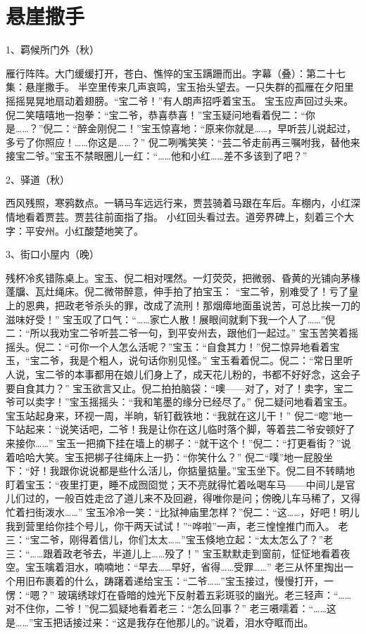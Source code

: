 \section*{悬崖撒手}
1、羁候所门外（秋）\par
雁行阵阵。大门缓缓打开，苍白、憔悴的宝玉蹒跚而出。字幕（叠）：第二十七集：悬崖撒手。
半空里传来几声哀鸣，宝玉抬头望去。一只失群的孤雁在夕阳里摇摇晃晃地扇动着翅膀。“宝二爷！”有人朗声招呼着宝玉。
宝玉应声回过头来。倪二笑嘻嘻地一抱拳：“宝二爷，恭喜恭喜！”宝玉疑问地看着倪二：“你是……？”倪二：“醉金刚倪二！”宝玉惊喜地：“原来你就是……，早听芸儿说起过，多亏了你照应！……你这是……？”
倪二咧嘴笑笑：“芸二爷走前再三嘱咐我，替他来接宝二爷。”宝玉不禁眼圈儿一红：“……他和小红……差不多该到了吧？”

2、驿道（秋）\par
西风残照，寒鸦数点。一辆马车远远行来，贾芸骑着马跟在车后。车棚内，小红深情地看着贾芸。贾芸往前面指了指。
小红回头看过去。道旁界碑上，刻着三个大字：平安州。小红酸楚地笑了。

3、街口小屋内（晚）\par
残杯冷炙错陈桌上。宝玉、倪二相对嘿然。一灯荧荧，把微弱、昏黄的光铺向茅椽蓬牖、瓦灶绳床。倪二微带醉意，伸手拍了拍宝玉：
“宝二爷，别难受了！亏了皇上的恩典，把政老爷杀头的罪，改成了流刑！那烟瘴地面虽说苦，可总比挨一刀的滋味好受！”
宝玉叹了口气：“……家亡人散！展眼间就剩下我一个人了……”倪二：“所以我劝宝二爷听芸二爷一句，到平安州去，跟他们一起过。”
宝玉苦笑着摇摇头。倪二：“可你一个人怎么活呢？”宝玉：“自食其力！”倪二惊异地看着宝玉，“宝二爷，我是个粗人，说句话你别见怪。”
宝玉看着倪二。倪二：“常日里听人说，宝二爷的本事都用在娘儿们身上了，成天花儿粉的，书都不好好念，这会子要自食其力？”
宝玉欲言又止。倪二拍拍脑袋：“噢——对了，对了！卖字，宝二爷可以卖字！”宝玉摇摇头：“我和笔墨的缘分已经尽了。”
倪二疑问地看着宝玉。宝玉站起身来，环视一周，半晌，斩钉截铁地：“我就在这儿干！”
倪二“唿”地一下站起来：“说笑话吧，二爷！我是让你在这儿临时落个脚，等着芸二爷安顿好了来接你……”
宝玉一把摘下挂在墙上的梆子：“就干这个！”倪二：“打更看街？”说着哈哈大笑。宝玉把梆子往绳床上一扔：“你笑什么？”
倪二“噗”地一屁股坐下：“好！我跟你说说都是些什么活儿，你掂量掂量。”宝玉坐下。倪二目不转睛地盯着宝玉：“夜里打更，睡不成囫囵觉；天不亮就得忙着吆喝车马——中间儿是官儿们过的，一般百姓走岔了道儿来不及回避，得唯你是问；傍晚儿车马稀了，又得忙着扫街泼水……”
宝玉冷冷一笑：“比狱神庙里怎样？”倪二：“这……，好吧！明儿我到营里给你挂个号儿，你干两天试试！”“哗啦”一声，老三惶惶推门而入。
老三：“宝二爷，刚得着信儿，你们太太……”宝玉倏地立起：“太太怎么了？”老三：“……跟着政老爷去，半道儿上……殁了！”
宝玉默默走到窗前，怔怔地看着夜空。宝玉噙着泪水，喃喃地：“早去……早好，省得……受罪……”
老三从怀里掏出一个用旧布裹着的什么，踌躇着递给宝玉：“二爷……”宝玉接过，慢慢打开，一愣：“嗯？”
玻璃绣球灯在昏暗的烛光下反射着五彩斑驳的幽光。老三轻声：“……对不住你，二爷！”倪二狐疑地看着老三：“怎么回事？”
老三嗫嚅着：“……这是……”宝玉把话接过来：“这是我存在他那儿的。”说着，泪水夺眶而出。

